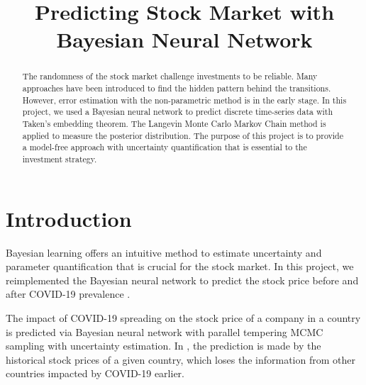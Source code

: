 \documentclass{article}
\title{Predicting Stock Market with Bayesian Neural Network}
\begin{document}
\maketitle


\begin{abstract}
The randomness of the stock market challenge investments to be reliable. Many approaches have been introduced to find the hidden pattern behind the transitions. However, error estimation with the non-parametric method is in the early stage. In this project, we used a Bayesian neural network to predict discrete  time-series data with Taken's embedding theorem. The Langevin Monte Carlo Markov Chain method is applied to measure the posterior distribution. The purpose of this project is to provide a model-free approach with uncertainty quantification that is essential to the investment strategy. 
\end{abstract}

\section{Introduction}





Bayesian learning offers an intuitive method to estimate uncertainty and parameter quantification that is crucial for the stock market.  In this project, we reimplemented the Bayesian neural network to predict the stock price before and after COVID-19 prevalence \cite{chandra2021bayesian}. 




The impact of COVID-19 spreading on the stock price of a company in a country is predicted via Bayesian neural network with parallel tempering MCMC sampling\cite{chandra2021bayesian, chandra2019langevin} with uncertainty estimation. In \cite{chandra2021bayesian}, the prediction is made by the historical stock prices of a given country, which loses the information from other countries impacted by COVID-19 earlier. 
\end{document}
